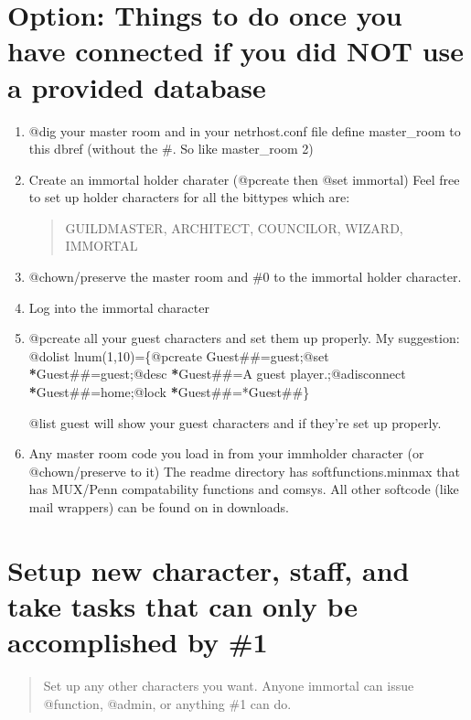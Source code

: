 \documentclass[letterpaper,10pt,english]{sphinxmanual}
\begin{document}
\section{Option: Things to do once you have connected if you did NOT use a provided database}
\label{\detokenize{24-quickinstall:option-things-to-do-once-you-have-connected-if-you-did-not-use-a-provided-database}}\begin{enumerate}
%
\item {} 
\sphinxAtStartPar
@dig your master room and in your netrhost.conf file define master\_room
to this dbref (without the \#.  So like master\_room 2)

\item {} 
\sphinxAtStartPar
Create an immortal holder charater (@pcreate then @set immortal)
Feel free to set up holder characters for all the bittypes which are:
\begin{quote}

\sphinxAtStartPar
GUILDMASTER, ARCHITECT, COUNCILOR, WIZARD, IMMORTAL
\end{quote}

\item {} 
\sphinxAtStartPar
@chown/preserve the master room and \#0 to the immortal holder character.

\item {} 
\sphinxAtStartPar
Log into the immortal character

\item {} 
\sphinxAtStartPar
@pcreate all your guest characters and set them up properly.  My suggestion:
@dolist lnum(1,10)=\{@pcreate Guest\#\#=guest;@set {\color{red}\bfseries{}*}Guest\#\#=guest;@desc {\color{red}\bfseries{}*}Guest\#\#=A guest player.;@adisconnect {\color{red}\bfseries{}*}Guest\#\#=home;@lock {\color{red}\bfseries{}*}Guest\#\#=*Guest\#\#\}

\sphinxAtStartPar
@list guest will show your guest characters and if they’re set up properly.

\item {} 
\sphinxAtStartPar
Any master room code you load in from your immholder character (or @chown/preserve to it)
The readme directory has softfunctions.minmax that has MUX/Penn compatability functions and comsys.
All other softcode (like mail wrappers) can be found on  in downloads.

\end{enumerate}


\section{Setup new character, staff, and take tasks that can only be accomplished by \#1}
\label{\detokenize{24-quickinstall:setup-new-character-staff-and-take-tasks-that-can-only-be-accomplished-by-1}}\begin{quote}

\sphinxAtStartPar
Set up any other characters you want.  Anyone immortal can issue @function, @admin, or anything \#1 can do.
\end{quote}
\end{document}
